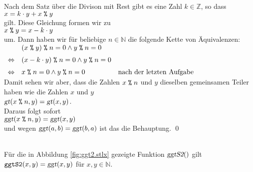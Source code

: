 \proof
Nach dem Satz \"{u}ber die Divison mit Rest gibt es eine Zahl $k \in \mathbb{Z}$, so dass
\\[0.2cm]
\hspace*{1.3cm}
$x = k \cdot y + x \;\texttt{\%}\; y$
\\[0.2cm]
gilt.  Diese Gleichung formen wir zu
\\[0.2cm]
\hspace*{1.3cm}
$x \;\texttt{\%}\; y = x - k \cdot y$
\\[0.2cm]
um.  Dann haben wir f\"{u}r beliebige $n \in \mathbb{N}$ die folgende Kette von \"{A}quivalenzen:
\\[0.2cm]
\hspace*{1.3cm}
$
\begin{array}[t]{lll}
                & (x \;\texttt{\%}\; y)   \;\texttt{\%}\; n = 0 \wedge y \;\texttt{\%}\; n = 0   \\[0.2cm]
\Leftrightarrow & (x - k \cdot y) \;\texttt{\%}\; n = 0 \wedge y \;\texttt{\%}\; n = 0   \\[0.2cm]
\Leftrightarrow & x \;\texttt{\%}\; n = 0 \wedge y \;\texttt{\%}\; n = 0               &
                  \mbox{nach der letzten Aufgabe}                        
\end{array}
$
\\[0.2cm]
Damit sehen wir aber, dass die Zahlen $x \;\texttt{\%}\; n$ und $y$ dieselben gemeinsamen Teiler haben wie
die Zahlen $x$ und $y$
\\[0.2cm]
\hspace*{1.3cm}
$\textsl{gt}(x \;\texttt{\%}\; n, y) = \textsl{gt}(x,y)$.
\\[0.2cm]
Daraus folgt sofort
\\[0.2cm]
\hspace*{1.3cm}
$\textsl{ggt}(x \;\texttt{\%}\; n, y) = \textsl{ggt}(x,y)$
\\[0.2cm]
und wegen $\textsl{ggt}(a,b) = \textsl{ggt}(b,a)$ ist das die Behauptung. \qed

\begin{Satz} \hspace*{\fill} \\
F\"{u}r die in Abbildung \ref{fig:ggt2.stlx} gezeigte Funktion $\textsl{ggtS2}()$ gilt
\\[0.2cm]
\hspace*{1.3cm}
$\texttt{ggtS2}(x,y) = \textsl{ggt}(x,y)$ \quad f\"{u}r $x,y \in \mathbb{N}$.
\end{Satz}

